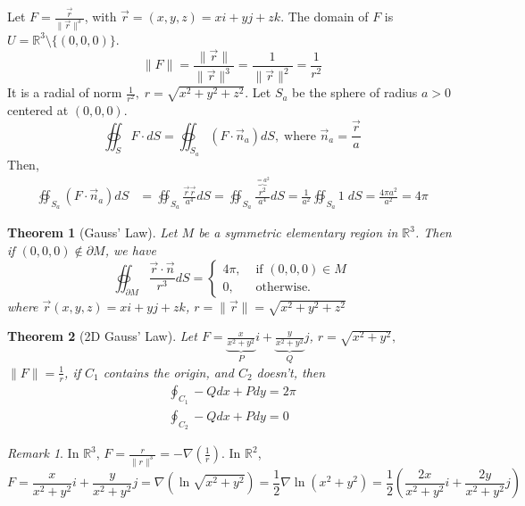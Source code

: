 \documentclass[12pt]{book}
\newtheorem{theorem}{Theorem}[section]
\theoremstyle{definition}
\theoremstyle{remark}
\newtheorem*{remark}{Remark}
\begin{document}
\begin{example}[]
  Let $F =\frac{\vec r}{\| \vec r \|^3} $, with $\vec r = (x,y,z ) = xi + y j + zk$. The domain of $F$ is $U = \mathbb{R}^3 \setminus \{(0,0,0)\}$. $$\| F\| = \frac{\|\vec r \| }{\| \vec r\|^3} = \frac{1}{\|\vec r\| ^2} = \frac{1}{r^2}    $$
  It is a radial of norm $\frac{1}{r^2}, \; r = \sqrt{x^2 + y^2 + z^2}.$ Let $S_a$ be the sphere of radius $a > 0$ centered at $(0,0,0)$. 
  $$\oiint_S F \cdot dS = \oiint_{S_a} (F \cdot {\vec n_a}) dS, \; \text{where }\vec n_a = \frac{\vec r}{a} $$
  Then, 
  \begin{equation*}
    \begin{split}
      \oiint_{S_a} ( F \cdot {\vec n_a}) dS &= \oiint_{S_a}\frac{\vec r \vec r}{a^4} dS = \oiint_{S_a} \frac{\overbrace{r^2}^{=a^2}}{a^4} dS = \frac{1}{a^2} \oiint_{S_a} 1 \; dS = \frac{4 \pi a^2}{a^2 }  =4 \pi
    \end{split}
  \end{equation*}
\end{example}
\begin{theorem}[Gauss' Law] \label{gauss law}
  Let $M$ be a symmetric elementary region in $\mathbb{R}^3$. Then if $(0, 0, 0)\notin \partial M$, we have
    $$\oiint_{\partial M} \frac{\vec r \cdot \vec n}{ r^3} dS= 
  \begin{cases}
    4\pi, &\text{ if } (0,0,0) \in M\\ 
    0, &\text{ otherwise.}
  \end{cases}  $$
  where $\vec r(x,y,z) = x i + yj + zk $,  $r = \| \vec{{r}} \| = \sqrt{x^ 2 + y^2 + z^2} {}$
\end{theorem}
\begin{theorem}[2D Gauss' Law]
  Let $F = \underbrace{\frac{x}{x^2 + y^2}}_{P} i + \underbrace{\frac{y}{x^2 + y^2}}_{Q} j$, $r = \sqrt{x^2 + y^2},$ $\|F\| = \frac{1}{r}$, if $C_1$ contains the origin, and $C_2$ doesn't, then
  \begin{equation*}
    \begin{split}
      \oint_{C_1} - Q dx + P dy = 2 \pi \\ 
      \oint_{C_2} -Q dx + P dy = 0 
    \end{split}
  \end{equation*}
  
\end{theorem}
\begin{remark} 
  In $\mathbb{R}^3$, $F = \frac{r}{\| r \|^3} = - \nabla \left( \frac{1}{r} \right).$ In $\mathbb{R}^2$, $$F = \frac{x}{x^2 + y^2}i + \frac{y}{x^2 + y^2 } j = \nabla \left( \ln \sqrt{x^2 + y^2} {} \right) = \frac{1}{2} \nabla \ln (x^2 + y^2) = \frac{1}{2} \left( \frac{2x}{x^2 + y^2 }i + \frac{2y}{x^2 +y^2}j   \right) $$
\end{remark}
\end{document}
